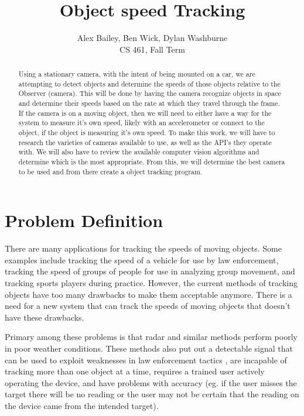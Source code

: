 \documentclass[letterpaper,10pt,onecolumn,draftclsnofoot]{IEEEtran}
\title{Object speed Tracking}
\author{Alex Bailey, Ben Wick, Dylan Washburne\\CS 461, Fall Term}
\begin{document}
\begin{titlepage}

\maketitle

\begin{abstract}
Using a stationary camera, with the intent of being mounted on a car, we are attempting to  detect objects and determine the speeds of those objects relative to the Observer (camera).
This will be done by having the camera recognize objects in space and determine their speeds based on the rate at which they travel through the frame.
If the camera is on a moving object, then we will need to either have a way for the system to measure it's own speed, likely with an accelerometer or connect to the object, if the object is measuring it's own speed.
To make this work, we will have to research the varieties of cameras available to use, as well as the API’s  they operate with.
We will also have to review the available computer vision algorithms and determine which is the most appropriate.
From this, we will determine the best camera to be used and from there create a object tracking program.
 
\end{abstract}

\end{titlepage}

\section{Problem Definition}

There are many applications for tracking the speeds of moving objects.
Some examples include tracking the speed of a vehicle for use by law enforcement, tracking the speed of groups of people for use in analyzing group movement, and tracking sports players during practice.
However, the current methods of tracking objects have too many drawbacks to make them acceptable anymore. 
There is a need for a new system that can track the speeds of moving objects that doesn't have these drawbacks.


Primary among these problems is that radar and similar methods perform poorly in poor weather conditions.
These methods also put out a detectable signal that can be used to exploit weaknesses in law enforcement tactics , are incapable of tracking more than one object at a time, requires a trained user actively operating the device, and have problems with accuracy (eg. if the user misses the target there will be no reading or the user may not be certain that the reading on the device came from the intended target).
\end{document}
